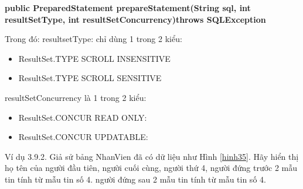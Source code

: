 \textbf{public PreparedStatement prepareStatement(String sql, int resultSetType, int resultSetConcurrency)throws SQLException}

Trong đó: 
resultsetType: chỉ dùng  1 trong 2 kiểu:
\begin{itemize}
	\item ResultSet.TYPE \text{\_}SCROLL \text{\_}INSENSITIVE
	\item ResultSet.TYPE \text{\_}SCROLL \text{\_}SENSITIVE
\end{itemize}
resultSetConcurrency là 1 trong 2 kiểu:
\begin{itemize}
	\item ResultSet.CONCUR \text{\_}READ \text{\_}ONLY:
	\item ResultSet.CONCUR \text{\_}UPDATABLE: 
\end{itemize}

Ví dụ 3.9.2. Giả sử bảng NhanVien đã có dữ liệu như Hình \ref{hinh35}. Hãy hiển thị họ tên của người đầu tiên, người cuối cùng, người thứ 4, người đứng trước 2 mẫu tin tính từ mẫu tin số 4. người đứng sau 2 mẫu tin tính từ mẫu tin số 4.

